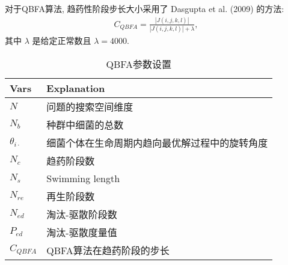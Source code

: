 对于QBFA算法, 趋药性阶段步长大小采用了 Dasgupta et al. (2009) 的方法:
\begin{align}
    C_{QBFA}=\frac{|J(i,j,k,l)|}{|J(i,j,k,l)|+\lambda},
\end{align}
其中 $\lambda$ 是给定正常数且 $\lambda=4000$.
\begin{table}
\begin{center}
\caption{QBFA参数设置}
\vspace{0.5em}
\centering
\begin{tabularx}{0.72\textwidth}{p{1.05cm}p{9.16cm}}
\hline
Vars &  Explanation\\
\hline
$N$&    问题的搜索空间维度\\
$N_b$&  种群中细菌的总数\\
$\theta_{i\cdot}$&  细菌个体在生命周期内趋向最优解过程中的旋转角度\\
$N_{c}$&  趋药阶段数\\
$N_s$&  Swimming length\\
$N_{re}$&  再生阶段数\\
$N_{ed}$&  淘汰-驱散阶段数\\
$P_{ed}$&  淘汰-驱散度量值\\
$C_{QBFA}$&   QBFA算法在趋药阶段的步长\\
\hline
\end{tabularx}
\label{Para_QBFASys20150225}
\end{center}
\vspace{-0.5cm}
\end{table}
